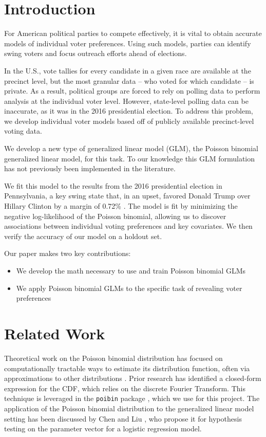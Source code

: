 \documentclass[10pt, letterpaper]{article}
\begin{document}
\begin{multicols}{2}

\section{Introduction}
For American political parties to compete effectively, it is vital to obtain accurate models of individual voter preferences. Using such models, parties can identify swing voters and focus outreach efforts ahead of elections. 

In the U.S., vote tallies for every candidate in a given race are available at the precinct level, but the most granular data -- who voted for which candidate -- is private. As a result, political groups are forced to rely on polling data to perform analysis at the individual voter level. However, state-level polling data can be inaccurate, as it was in the 2016 presidential election. To address this problem, we develop individual voter models based off of publicly available precinct-level voting data.

We develop a new type of generalized linear model (GLM), the Poisson binomial generalized linear model, for this task. To our knowledge this GLM formulation has not previously been implemented in the literature. 

We fit this model to the results from the 2016 presidential election in Pennsylvania, a key swing state that, in an upset, favored Donald Trump over Hillary Clinton by a margin of 0.72\% \cite{NYT}. The model is fit by minimizing the negative log-likelihood of the Poisson binomial, allowing us to discover associations between individual voting preferences and key covariates. We then verify the accuracy of our model on a holdout set. 

Our paper makes two key contributions:
\begin{itemize}[noitemsep]
	\item We develop the math necessary to use and train Poisson binomial GLMs
	\item We apply Poisson binomial GLMs to the specific task of revealing voter preferences
\end{itemize}

\section{Related Work}
Theoretical work on the Poisson binomial distribution has focused on computationally tractable ways to estimate its distribution function, often via approximations to other distributions 
\cite{EHM19917, roos1999, chen1974}. Prior research \cite{HONG201341} has identified a closed-form expression for the CDF, which relies on the discrete Fourier Transform. This technique is leveraged in the \texttt{poibin} package \cite{PoibiGithub}, which we use for this project. The application of the Poisson binomial distribution to the generalized linear model setting has been discussed by Chen and Liu \cite{Poibi}, who propose it for hypothesis testing on the parameter vector for a logistic regression model. 


\end{multicols}
\end{document}
